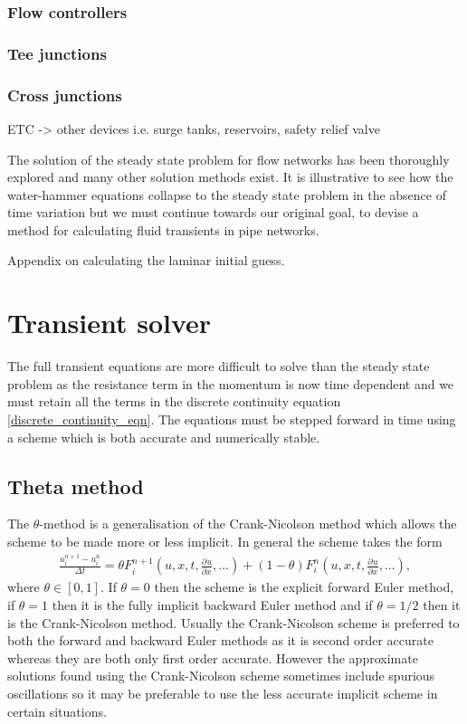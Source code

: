 \documentclass[12pt]{article}
\newcommand{\pardiv}[3]{\frac{\partial^{#1} #2}{\partial #3^{#1}}}
\begin{document}
\subsubsection{Flow controllers}

\subsubsection{Tee junctions}

\subsubsection{Cross junctions}

{\color{red} ETC -> other devices i.e. surge tanks, reservoirs, safety relief valve}

The solution of the steady state problem for flow networks has been thoroughly explored and many other solution methods exist. It is illustrative to see how the water-hammer equations collapse to the steady state problem in the absence of time variation but we must continue towards our original goal, to devise a method for calculating fluid transients in pipe networks. 

{\color{red} Appendix on calculating the laminar initial guess.}

\section{Transient solver} \label{sec:transient_solver}

The full transient equations are more difficult to solve than the steady state problem as the resistance term in the momentum is now time dependent and we must retain all the terms in the discrete continuity equation \eqref{discrete_continuity_eqn}. The equations must be stepped forward in time using a scheme which is both accurate and numerically stable. 

\subsection{Theta method}

The $\theta$-method is a generalisation of the Crank-Nicolson method which allows the scheme to be made more or less implicit. In general the scheme takes the form
\begin{align}
\frac{u_i^{n+1} - u_i^{n}}{\Delta t} = \theta F_i^{n+1}\left(u,x,t,\pardiv{}{u}{x},\ldots \right) + (1-\theta) F_i^{n}\left(u,x,t,\pardiv{}{u}{x},\ldots \right),
\end{align}
where $\theta \in [0,1]$. If $\theta = 0$ then the scheme is the explicit forward Euler method, if $\theta = 1$ then it is the fully implicit backward Euler method and if $\theta = 1/2$ then it is the Crank-Nicolson method. Usually the Crank-Nicolson scheme is preferred to both the forward and backward Euler methods as it is second order accurate whereas they are both only first order accurate. However the approximate solutions found using the Crank-Nicolson scheme sometimes include spurious oscillations so it may be preferable to use the less accurate implicit scheme in certain situations.
\end{document}
